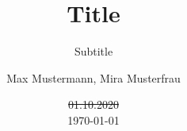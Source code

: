 \author{
	Max Mustermann,
	Mira Musterfrau
}
\titlehead{titlehead}
\subject{Subject}
\title{Title}
\subtitle{Subtitle}
\date{\st{01.10.2020}\\\today}
